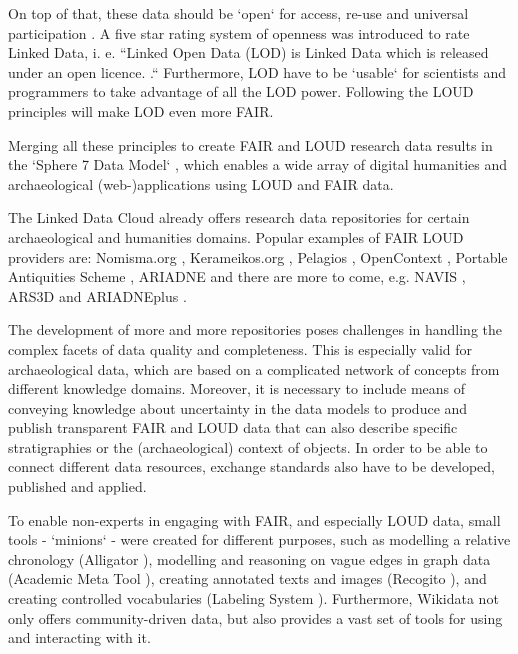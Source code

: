 \documentclass[a4paper]{article}
\begin{document}
On top of that, these data should be `open` for access, re-use and universal participation \cite{open_data_handbook_what_2019}. A five star rating system of openness \cite{hausenblas_5_star_2012} was introduced to rate Linked Data, i. e. “Linked Open Data (LOD) is Linked Data which is released under an open licence. \cite{berners-lee_linked_2006}.“ Furthermore, LOD have to be `usable` for scientists and programmers to take advantage of all the LOD power. Following the LOUD principles\cite{sanderson_loud_2019} will make LOD even more FAIR.

Merging all these principles to create FAIR and LOUD research data results in the `Sphere 7 Data Model` \cite{thiery_sphere_2019}, which enables a wide array of digital humanities and archaeological (web-)applications using LOUD and FAIR data.

The Linked Data Cloud already offers research data repositories for certain archaeological and humanities domains. Popular examples of FAIR LOUD providers are: Nomisma.org \cite{gruber_linked_2018}, Kerameikos.org \cite{gruber_linked_2015}, Pelagios \cite{isaksen_pelagios_2014}, OpenContext \cite{kansa_publishing_2007}, Portable Antiquities Scheme \cite{harper_toys_2018}, ARIADNE \cite{consiglio_nazionale_delle_ricerche_isti_enabling_2017} and there are more to come, e.g. NAVIS \cite{thiery_taming_2018_1}, ARS3D \cite{thiery_ars3d_2019} and ARIADNEplus \cite{ariadneplus_ariadneplus_2019}. 

The development of more and more repositories poses challenges in handling the complex facets of data quality and completeness. This is especially valid for archaeological data, which are based on a complicated network of concepts from different knowledge domains. Moreover, it is necessary to include means of conveying knowledge about uncertainty in the data models to produce and publish transparent FAIR and LOUD data that can also describe specific stratigraphies or the (archaeological) context of objects. In order to be able to connect different data resources, exchange standards also have to be developed, published and applied.

To enable non-experts in engaging with FAIR, and especially LOUD data, small tools - `minions` - were created for different purposes, such as modelling a relative chronology (Alligator \cite{seidensticker_rdf_2018}), modelling and reasoning on vague edges in graph data (Academic Meta Tool \cite{thiery_taming_2018}), creating annotated texts and images (Recogito \cite{simon_linked_2017}), and creating controlled vocabularies (Labeling System \cite{thiery_labeling_2016}). Furthermore, Wikidata \cite{mika_introducing_2014} not only offers community-driven data, but also provides a vast set of tools for using and interacting with it.
\end{document}
